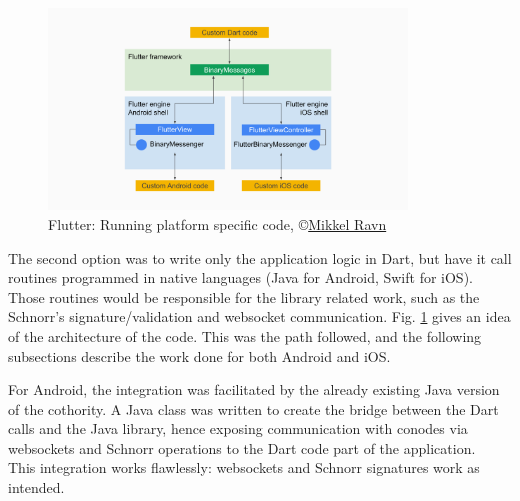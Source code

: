 \documentclass[11pt, a4paper, twoside, openright]{article} %
\begin{document}
{\begin{figure}
	\centering
	\includegraphics[width=0.85\textwidth]{img/Flutter_native_code.png}
	
	\caption{Flutter: Running platform specific code, \copyright \href{https://medium.com/flutter-io/flutter-platform-channels-ce7f540a104e}{Mikkel Ravn}}
	\label{fig:flutter_native_code}
\end{figure}
The second option was to write only the application logic in Dart, but have it call routines programmed in native languages (Java for Android, Swift for iOS). Those routines would be responsible for the library related work, such as the Schnorr's signature/validation and websocket communication. Fig. \ref{fig:flutter_native_code} gives an idea of the architecture of the code.
This was the path followed, and the following subsections describe the work done for both Android and iOS.

For Android, the integration was facilitated by the already existing Java version of the cothority. A Java class was written to create the bridge between the Dart calls and the Java library, hence exposing communication with conodes via websockets and Schnorr operations to the Dart code part of the application.\\
This integration works flawlessly: websockets and Schnorr signatures work as intended.

}
\end{document}

